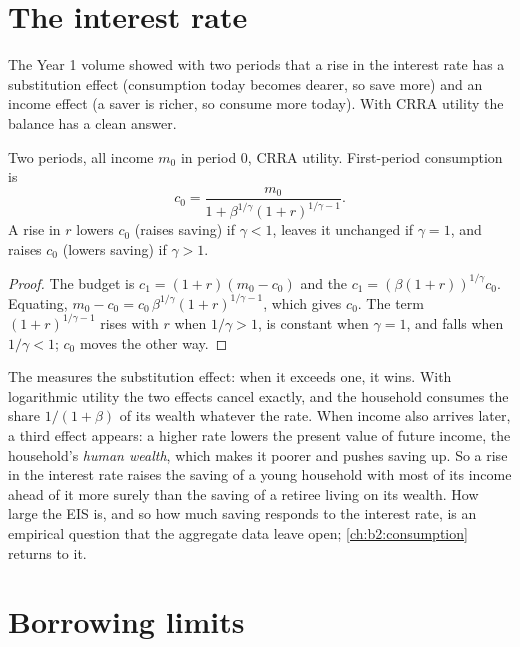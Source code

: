 \section{The interest rate}\label{sec:b2:intertemporal-choice:rate}

The Year 1 volume showed with two periods that a rise in the interest rate has a substitution effect
(consumption today becomes dearer, so save more) and an income effect (a saver is richer, so consume
more today). With CRRA utility the balance has a clean answer.

\begin{proposition}\label{prop:b2:intertemporal-choice:rate}
Two periods, all income $m_0$ in period 0, CRRA utility. First-period consumption is
\[
c_0 = \frac{m_0}{1 + \beta^{1/\gamma}(1 + r)^{1/\gamma - 1}} .
\]
A rise in $r$ lowers $c_0$ (raises saving) if $\gamma < 1$, leaves it unchanged if $\gamma = 1$, and
raises $c_0$ (lowers saving) if $\gamma > 1$.
\end{proposition}

\begin{proof}
The budget is $c_1 = (1 + r)(m_0 - c_0)$ and the  $c_1 = (\beta(1 + r))^{1/\gamma}c_0$.
Equating, $m_0 - c_0 = c_0\,\beta^{1/\gamma}(1 + r)^{1/\gamma - 1}$, which gives $c_0$. The term $(1 +
r)^{1/\gamma - 1}$ rises with $r$ when $1/\gamma > 1$, is constant when $\gamma = 1$, and falls when
$1/\gamma < 1$; $c_0$ moves the other way.
\end{proof}

The  measures the substitution effect: when it exceeds one,
it wins. With logarithmic utility the two effects cancel exactly, and the household consumes the
share $1/(1 + \beta)$ of its wealth whatever the rate. When income also arrives later, a third effect
appears: a higher rate lowers the present value of future income, the household's \emph{human wealth},
which makes it poorer and pushes saving up. So a rise in the interest rate raises the saving of a young
household with most of its income ahead of it more surely than the saving of a retiree living on its
wealth. How large the EIS is, and so how much saving responds to the interest rate, is an empirical
question that the aggregate data leave open; \cref{ch:b2:consumption} returns to it.

\section{Borrowing limits}\label{sec:b2:intertemporal-choice:borrowing}

